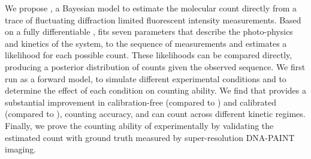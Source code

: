 We propose \ours, a Bayesian model to estimate the molecular count
directly from a trace of fluctuating diffraction limited fluorescent
intensity measurements.
  Based on a fully differentiable \hmm, \ours fits
  seven parameters that describe the photo-physics and kinetics of the system, 
  to the sequence of measurements and
  estimates a likelihood for each possible count.
  These likelihoods can be compared directly, producing a posterior
  distribution of counts given the observed sequence.
  We first run \ours as a forward model, to simulate
  different experimental conditions and to determine the effect of 
  each condition on counting ability.
  We find that \ours provides a substantial improvement in calibration-free 
  (compared to \lbfcs) 
  and calibrated (compared to \qpaint), counting accuracy, and can 
  count across different kinetic regimes.
  Finally, we prove the counting ability of \ours experimentally by validating 
  the estimated count with ground truth measured by super-resolution DNA-PAINT imaging.
